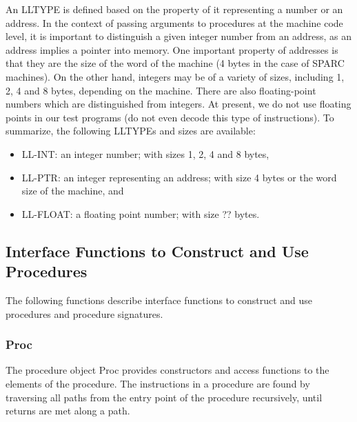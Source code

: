 An LLTYPE is defined based on the property of it representing
a number or an address.  In the context of passing arguments
to procedures at the machine code level, it is important to
distinguish a given integer number from an address, as an address 
implies a pointer into memory.  One important property of addresses 
is that they are the size of the word of the machine (4 bytes in the
case of SPARC machines).  On the other hand, integers may be of a 
variety of sizes, including 1, 2, 4 and 8 bytes, depending on the machine. 
There are also floating-point numbers which are distinguished 
from integers.  At present, we do not use floating points in our
test programs (do not even decode this type of instructions). 
To summarize, the following LLTYPEs and sizes are available:
\begin{itemize}
\item LL-INT: an integer number; with sizes 1, 2, 4 and 8 bytes, 
\item LL-PTR: an integer representing an address; with size 4 bytes
    or the word size of the machine, and 
\item LL-FLOAT: a floating point number; with size ?? bytes.
\end{itemize}


\subsection{Interface Functions to Construct and Use Procedures}
The following functions describe interface functions to 
construct and use procedures and procedure signatures.


\subsubsection{Proc}
The procedure object Proc provides constructors and access 
functions to the elements of the procedure.
The instructions in a procedure are found by traversing all
paths from the entry point of the procedure recursively, until 
returns are met along a path.

